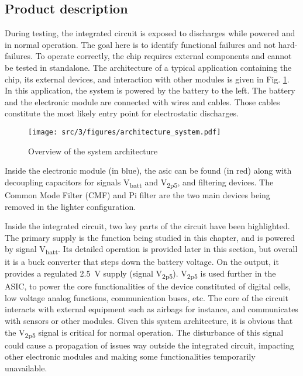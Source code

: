 \subsection{Product description}
\label{sec:product-desc}

During testing, the integrated circuit is exposed to discharges while powered and in normal operation.
The goal here is to identify functional failures and not hard-failures.
To operate correctly, the chip requires external components and cannot be tested in standalone.
The architecture of a typical application containing the chip, its external devices, and interaction with other modules is given in Fig. \ref{fig:system_architecture}.
In this application, the system is powered by the battery to the left.
The battery and the electronic module are connected with wires and cables.
Those cables constitute the most likely entry point for electrostatic discharges.

\begin{figure}[!h]
  \centering
  \texttt{[image: src/3/figures/architecture\_system.pdf]}
  \caption{Overview of the system architecture}
  \label{fig:system_architecture}
\end{figure}

Inside the electronic module (in blue), the \gls{asic} can be found (in red) along with decoupling capacitors for signals V\textsubscript{batt} and V\textsubscript{2p5}, and filtering devices.
The Common Mode Filter (CMF) and Pi filter are the two main devices being removed in the lighter configuration.

Inside the integrated circuit, two key parts of the circuit have been highlighted.
The primary supply is the function being studied in this chapter, and is powered by signal V\textsubscript{batt}.
Its detailed operation is provided later in this section, but overall it is a buck converter that steps down the battery voltage.
On the output, it provides a regulated \SI{2.5}{\volt} supply (signal V\textsubscript{2p5}).
V\textsubscript{2p5} is used further in the ASIC, to power the core functionalities of the device constituted of digital cells, low voltage analog functions, communication buses, etc.
The core of the circuit interacts with external equipment such as airbags for instance, and communicates with sensors or other modules.
Given this system architecture, it is obvious that the V\textsubscript{2p5} signal is critical for normal operation.
The disturbance of this signal could cause a propagation of issues way outside the integrated circuit, impacting other electronic modules and making some functionalities temporarily unavailable.

